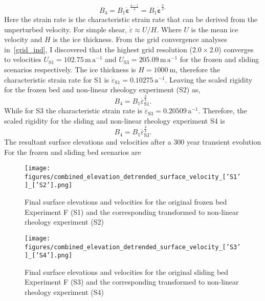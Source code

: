 \begin{equation}
B_4 = B_1 \mathbf{\dot{\varepsilon}}^{\frac{4-1}{4}} = B_1 \mathbf{\dot{\varepsilon}}^{\frac{3}{4},}
\end{equation}
Here the strain rate is the characteristic strain rate that can be derived from the unperturbed velocity. For simple shear, $\dot{\varepsilon} \approx U / H$. Where $U$ is the mean ice velocity and $H$ is the ice thickness. 
From the grid convergence analyses in~\ref{grid_ind}, I discovered that the highest grid resolution ($2.0\times2.0$) converges to velocities $U_{\mathrm{S1}}=102.75 \, \mathrm{m\,a^{-1}}$ and $U_{\mathrm{S3}}=205.09 \, \mathrm{m\,a^{-1}}$ for the frozen and sliding scenarios respectively. The ice thickness is $H=1000~\mathrm{m}$, therefore the characteristic strain rate for S1 is $\dot{\varepsilon}_{\mathrm{S1}}=  0.10275\,\mathrm{a^{-1}}$. Leaving the scaled rigidity for the frozen bed and non-linear rheology experiment (S2) as, 
\begin{equation}
B_4 = B_1 \dot{\varepsilon}_{\mathrm{S1}}^{\frac{3}{4}}.
\end{equation}
While for S3 the characteristic strain rate is $\dot{\varepsilon}_{\mathrm{S3}}= 0.20509 \,\mathrm{a^{-1}}.$ Therefore, the scaled rigidity for the sliding and non-linear rheology experiment S4 is
\begin{equation}
B_4 = B_1 \dot{\varepsilon}_{\mathrm{S3}}^{\frac{3}{4}}.
\end{equation}
The resultant surface elevations and velocities after a 300 year transient evolution For the frozen and sliding bed scenarios are 
\begin{figure}[H]
    \texttt{[image: figures/combined\_elevation\_detrended\_surface\_velocity\_['S1']\_['S2'].png]}
    \caption{Final surface elevations and velocities for the original frozen bed Experiment F (S1) and the corresponding transformed to non-linear rheology experiment (S2)}
    \label{fig:elev_vel_S1_S2}
\end{figure}
\begin{figure}[H]
    \texttt{[image: figures/combined\_elevation\_detrended\_surface\_velocity\_['S3']\_['S4'].png]}
    \caption{Final surface elevations and velocities for the original sliding bed Experiment F (S3) and the corresponding transformed to non-linear rheology experiment (S4)}
    \label{fig:elev_vel_S3_S4}
\end{figure}

